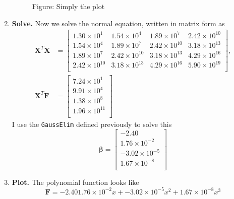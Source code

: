 \documentclass[../../../main.tex]{subfiles}
\begin{document}
\begin{enumerate}
          \begin{figure}[t]
              \centering
              \caption*{Figure: Simply the plot}
          \end{figure}


    \item \textbf{Solve.} Now we solve the normal equation, written in matrix form as
          \begin{align*}
              \mathbf{X}^T \mathbf{X} & =
              \begin{bmatrix}
                  1.30\times 10^{1}  & 1.54\times 10^{4}  & 1.89\times 10^{7}  & 2.42\times 10^{10} \\
                  1.54\times 10^{4}  & 1.89\times 10^{7}  & 2.42\times 10^{10} & 3.18\times 10^{13} \\
                  1.89\times 10^{7}  & 2.42\times 10^{10} & 3.18\times 10^{13} & 4.29\times 10^{16} \\
                  2.42\times 10^{10} & 3.18\times 10^{13} & 4.29\times 10^{16} & 5.90\times 10^{19} \\
              \end{bmatrix},
              \\
              \mathbf{X}^T\mathbf{F}  & =
              \begin{bmatrix}
                  7.24\times 10^{1}  \\
                  9.91\times 10^{4}  \\
                  1.38\times 10^{8}  \\
                  1.96\times 10^{11} \\
              \end{bmatrix}
          \end{align*}
          I use the \verb|GaussElim| defined previously to solve this
          \begin{equation*}
              \boldsymbol{\beta}=
              \begin{bmatrix}
                  -2.40               \\
                  1.76\times 10^{-2}  \\
                  -3.02\times 10^{-5} \\
                  1.67\times 10^{-8}  \\
              \end{bmatrix}
          \end{equation*}


    \item \textbf{Plot.} The polynomial function looks like
          \begin{equation*}
              \mathbf{F}=
              -2.40
              1.76\times 10^{-2}  x+
              -3.02\times 10^{-5} x^2+
              1.67\times 10^{-8}  x^3
          \end{equation*}

\end{enumerate}
\end{document}
